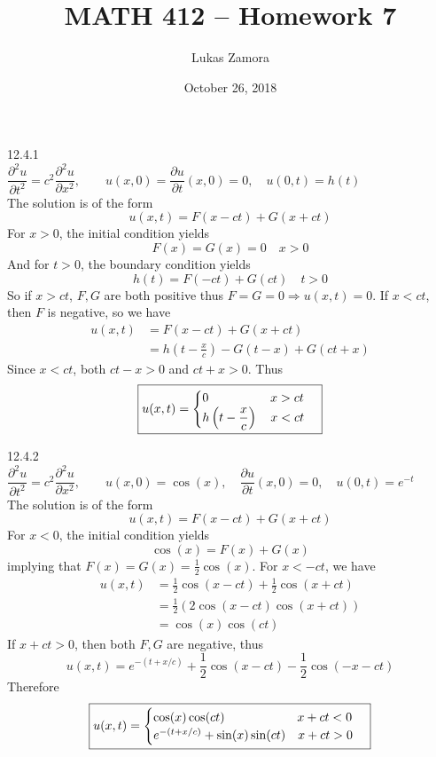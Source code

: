 \documentclass{article}
\title{MATH 412 -- Homework 7}
\author{Lukas Zamora}
\date{October 26, 2018}
\theoremstyle{definition}
\begin{document}
    \maketitle
    
    \begin{prob}{12.4.1} $  $ \vspace{3mm} \\
    	$ \dfrac{\partial^2 u}{\partial t^2} = c^2 \dfrac{\partial^2 u}{\partial x^2}, \qquad u(x,0) = \dfrac{\partial u}{\partial t}(x,0) = 0, \quad u(0,t) = h(t) $ \\
    	
    	The solution is of the form
    	\[ u(x,t) = F(x-ct) + G(x+ct) \]
    	For $ x>0 $, the initial condition yields
    	\[ F(x) = G(x) = 0 \quad x>0 \]
    	And for $ t>0 $, the boundary condition yields
    	\[ h(t) = F(-ct) + G(ct) \quad t>0 \]
    	So if $ x>ct $, $ F,G $ are both positive thus $ F=G=0 \Rightarrow u(x,t) = 0 $. If $ x<ct $, then $ F $ is negative, so we have
    	\begin{align*}
    		u(x,t) &= F(x-ct) + G(x+ct) \\
    			   &= h\left( t - \frac{x}{c} \right) - G(t-x) + G(ct+x) 
    	\end{align*}
    	Since $ x<ct $, both $ ct-x>0 $ and $ ct+x>0 $. Thus
    	\[
    		\boxed{ u(x,t) = \begin{cases} 0 \hspace{1.75cm} x>ct \\ h\left( t - \dfrac{x}{c} \right) \quad x<ct \end{cases} }
    	\]
    \end{prob}
    
    \begin{prob}{12.4.2} $  $ \vspace{3mm} \\
    	$ \dfrac{\partial^2 u}{\partial t^2} = c^2 \dfrac{\partial^2 u}{\partial x^2}, \qquad u(x,0) = \cos(x), \quad \dfrac{\partial u}{\partial t}(x,0) = 0, \quad u(0,t) = e^{-t} $ \\
    	
    	The solution is of the form
    	\[ u(x,t) = F(x-ct) + G(x+ct) \]
    	For $ x<0 $, the initial condition yields
    	\[ \cos(x) = F(x) + G(x) \]
    	implying that $ F(x) = G(x) = \frac{1}{2}\cos(x) $. For $ x<-ct $, we have
    	\begin{align*}
    		u(x,t) &= \frac{1}{2}\cos(x-ct) + \frac{1}{2}\cos(x+ct) \\
    			   &= \frac{1}{2} (2\cos(x-ct)\cos(x+ct)) \\
    			   &= \cos(x)\cos(ct) 
    	\end{align*}
    	If $ x+ct > 0 $, then both $ F,G $ are negative, thus
    	\[ u(x,t) = e^{-(t+x/c)} + \frac{1}{2}\cos(x-ct) - \frac{1}{2}\cos(-x-ct) \]
    	Therefore
    	\[
    		\boxed{ u(x,t) = \begin{cases} \cos(x)\cos(ct) \hspace{2.06cm} x+ct<0  \\ e^{-(t+x/c)}+\sin(x)\sin(ct) \quad x+ct>0 \end{cases} }
    	\]
    \end{prob}
    
\end{document}
